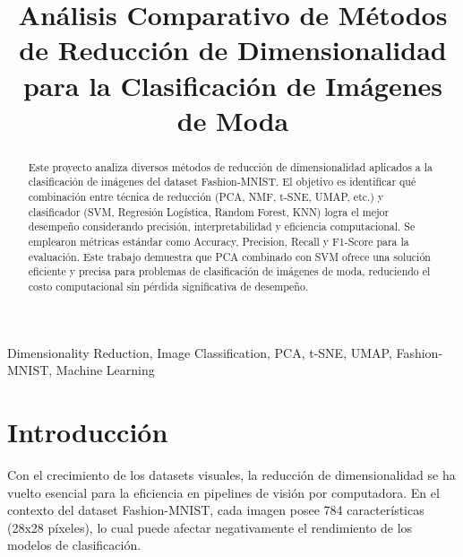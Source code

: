 \documentclass[conference]{IEEEtran}
\begin{document}
\title{Análisis Comparativo de Métodos de Reducción de Dimensionalidad para la Clasificación de Imágenes de Moda}

\author{
\and
{}
}

\maketitle

\begin{abstract}
Este proyecto analiza diversos métodos de reducción de dimensionalidad aplicados a la clasificación de imágenes del dataset Fashion-MNIST. 
El objetivo es identificar qué combinación entre técnica de reducción (PCA, NMF, t-SNE, UMAP, etc.) y clasificador (SVM, Regresión Logística, Random Forest, KNN) logra el mejor desempeño considerando precisión, interpretabilidad y eficiencia computacional. 
Se emplearon métricas estándar como Accuracy, Precision, Recall y F1-Score para la evaluación. 
Este trabajo demuestra que PCA combinado con SVM ofrece una solución eficiente y precisa para problemas de clasificación de imágenes de moda, reduciendo el costo computacional sin pérdida significativa de desempeño.
\end{abstract}

\begin{IEEEkeywords}
Dimensionality Reduction, Image Classification, PCA, t-SNE, UMAP, Fashion-MNIST, Machine Learning
\end{IEEEkeywords}

\section{Introducción}
Con el crecimiento de los datasets visuales, la reducción de dimensionalidad se ha vuelto esencial para la eficiencia en pipelines de visión por computadora.
En el contexto del dataset Fashion-MNIST, cada imagen posee 784 características (28x28 píxeles), lo cual puede afectar negativamente el rendimiento de los modelos de clasificación.
\end{document}
